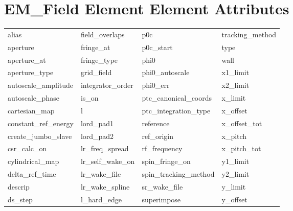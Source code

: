 \vfill
 
 \section{EM_Field Element Element Attributes}
 \label{s:list.em.field}
 
 \begin{tabular}{llll} \toprule
alias                       & field_overlaps              & p0c                         & tracking_method             \\
aperture                    & fringe_at                   & p0c_start                   & type                        \\
aperture_at                 & fringe_type                 & phi0                        & wall                        \\
aperture_type               & grid_field                  & phi0_autoscale              & x1_limit                    \\
autoscale_amplitude         & integrator_order            & phi0_err                    & x2_limit                    \\
autoscale_phase             & is_on                       & ptc_canonical_coords        & x_limit                     \\
cartesian_map               & l                           & ptc_integration_type        & x_offset                    \\
constant_ref_energy         & lord_pad1                   & reference                   & x_offset_tot                \\
create_jumbo_slave          & lord_pad2                   & ref_origin                  & x_pitch                     \\
csr_calc_on                 & lr_freq_spread              & rf_frequency                & x_pitch_tot                 \\
cylindrical_map             & lr_self_wake_on             & spin_fringe_on              & y1_limit                    \\
delta_ref_time              & lr_wake_file                & spin_tracking_method        & y2_limit                    \\
descrip                     & lr_wake_spline              & sr_wake_file                & y_limit                     \\
ds_step                     & l_hard_edge                 & superimpose                 & y_offset                    \\

\end{tabular}
